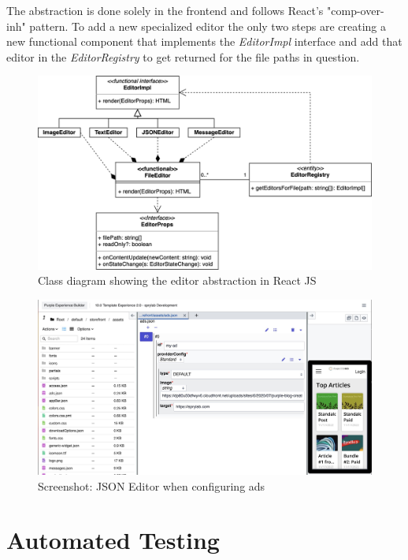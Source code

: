 The abstraction is done solely in the frontend and follows React's "\Gls{comp-over-inh}" pattern.
To add a new specialized editor the only two steps are creating a new functional component that implements the \textit{EditorImpl} interface
and add that editor in the \textit{EditorRegistry} to get returned for the file paths in question.

\begin{figure}[h]
  \includegraphics[width=\textwidth]{pics/abstract_editor_uml.drawio.png}
  \caption{Class diagram showing the editor abstraction in React JS}
  \label{fig:abstract-editor}
\end{figure}
\begin{figure}[h]
  \includegraphics[width=\textwidth]{pics/ads_json_editor.jpg}
  \caption{Screenshot: JSON Editor when configuring ads}
  \label{fig:ads-editor}
\end{figure}


\section{Automated Testing}
\label{sec:automated-testing}

